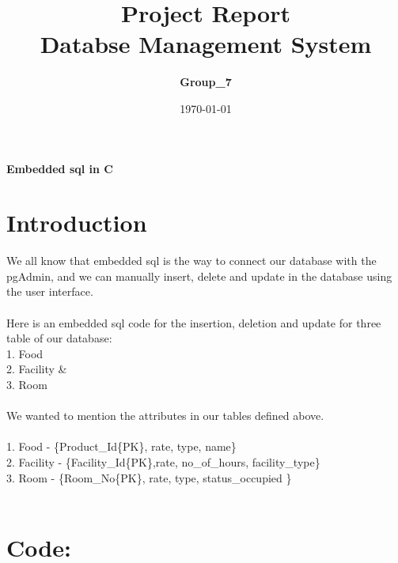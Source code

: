 \documentclass[a4,12pt]{report}
\title{ Project Report \\
				 \textbf{Databse Management System}}
\author{\textbf{Group\_7}}
\date{\today}
\begin{document}
\maketitle

\begin{center}
	\textbf{Embedded sql in C}
\end{center}


\section*{Introduction}
 We all know that embedded sql is the way to connect our database with the pgAdmin, and we can manually insert, delete and update in the database using the user interface.\\\\
 
Here is an embedded sql code for the insertion, deletion and update for three table of our database:\\
1. Food \\
2. Facility \&\\
3. Room \\\\

We wanted to mention the attributes in our tables defined above.\\\\
1. Food -       \{Product\_Id\{PK\}, rate, type, name\}\\
2. Facility -   \{Facility\_Id\{PK\},rate, no\_of\_hours, facility\_type\}\\
3. Room    -    \{Room\_No\{PK\}, rate, type, status\_occupied \}\\\\


\section*{Code:}
\end{document}
